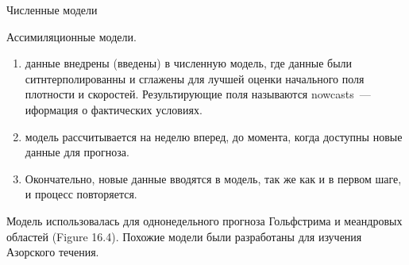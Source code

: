 \begin{chapter}{Численные модели}
\begin{section}{Ассимиляционные модели.}
\begin{enumerate}
\item
данные внедрены (введены) в численную модель, где данные были
ситнтерполированны и сглажены для лучшей оценки начального поля
плотности и скоростей. Результирующие поля называются nowcasts~---
иформация о фактических условиях.
%

\item
модель рассчитывается на неделю вперед, до момента, когда доступны
новые данные для прогноза. 
%

\item
Окончательно, новые данные вводятся в модель, так же как и в первом
шаге, и процесс повторяется.
%
\end{enumerate}
Модель использовалась для однонедельного прогноза Гольфстрима и
меандровых областей (Figure 16.4). Похожие модели были разработаны для
изучения Азорского течения.
%


\end{section}
\end{chapter}
